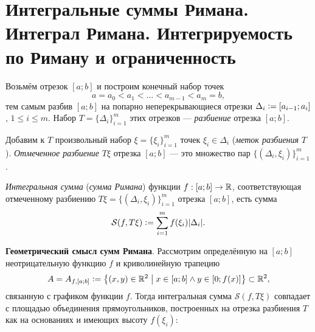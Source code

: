 \section{Интегральные суммы Римана. Интеграл Римана. Интегрируемость по Риману и ограниченность}

\begin{definition}
    Возьмём отрезок $[a; b]$ и построим конечный набор точек
    \[
        a = a_0 < a_1 < \ldots < a_{m - 1} < a_m = b,
    \]
    тем самым разбив $[a; b]$ на попарно неперекрывающиеся отрезки $\Delta_i \vcentcolon = [a_{i - 1}; a_i]$, $1 \leqslant i \leqslant m$. Набор $T = \{\Delta_i\}_{i = 1}^m$ этих отрезков --- \textit{разбиение} отрезка $[a; b]$.
\end{definition}

\begin{definition}
    Добавим к $T$ произвольный набор $\xi = \{\xi_i\}_{i = 1}^m$ точек $\xi_i \in \Delta_i$ (\textit{меток разбиения} $T$). \textit{Отмеченное разбиение} $T\xi$ отрезка $[a; b]$ --- это множество пар $\{(\Delta_i, \xi_i)\}_{i = 1}^m$.
\end{definition}

\begin{definition}
    \textit{Интегральная сумма} (\textit{сумма Римана}) функции $f: [a; b] \to \mathbb{R}$, соответствующая отмеченному разбиению $T\xi = \{(\Delta_i, \xi_i)\}_{i = 1}^m$ отрезка $[a; b]$, есть сумма
    \[
        \mathcal{S}(f, T\xi) \vcentcolon = \sum_{i = 1}^mf(\xi_i)|\Delta_i|.
    \]
\end{definition}

\textbf{Геометрический смысл сумм Римана}. Рассмотрим определённую на $[a; b]$ неотрицательную функцию $f$ и криволинейную трапецию
\[
    A = A_{f, [a; b]} \vcentcolon = \left\{(x, y) \in \mathbb{R}^2\;\middle\vert\; x \in [a; b] \wedge y \in [0; f(x)]\right\} \subset \mathbb{R}^2,
\]
связанную с графиком функции $f$. Тогда интегральная сумма $\mathcal{S}(f, T\xi)$ совпадает с площадью объединения прямоугольников, построенных на отрезка разбиения $T$ как на основаниях и имеющих высоту $f(\xi_i)$:

